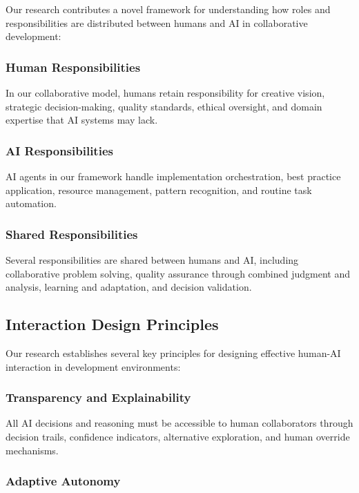 Our research contributes a novel framework for understanding how roles and responsibilities are distributed between humans and AI in collaborative development:

\subsubsection{Human Responsibilities}

In our collaborative model, humans retain responsibility for creative vision, strategic decision-making, quality standards, ethical oversight, and domain expertise that AI systems may lack.

\subsubsection{AI Responsibilities}

AI agents in our framework handle implementation orchestration, best practice application, resource management, pattern recognition, and routine task automation.

\subsubsection{Shared Responsibilities}

Several responsibilities are shared between humans and AI, including collaborative problem solving, quality assurance through combined judgment and analysis, learning and adaptation, and decision validation.

\subsection{Interaction Design Principles}

Our research establishes several key principles for designing effective human-AI interaction in development environments:

\subsubsection{Transparency and Explainability}

All AI decisions and reasoning must be accessible to human collaborators through decision trails, confidence indicators, alternative exploration, and human override mechanisms.

\subsubsection{Adaptive Autonomy}

